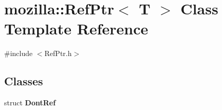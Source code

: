 \hypertarget{classmozilla_1_1_ref_ptr}{\section{mozilla\-:\-:Ref\-Ptr$<$ T $>$ Class Template Reference}
\label{classmozilla_1_1_ref_ptr}
}


{\ttfamily \#include $<$Ref\-Ptr.\-h$>$}

\subsection*{Classes}
\begin{DoxyCompactItemize}
\item 
struct {\bfseries Dont\-Ref}
\end{DoxyCompactItemize}
